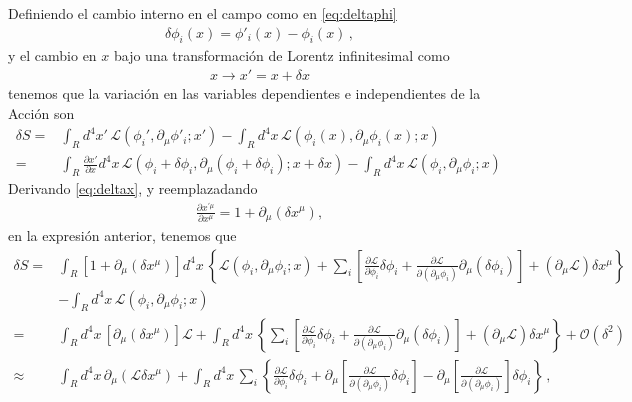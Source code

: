 \begin{frame}
Definiendo el cambio interno en el campo como en \eqref{eq:deltaphi}
\begin{align}
  \delta\phi_i(x)=\phi'_i(x)-\phi_i(x)\,,
\end{align}
y el cambio en $x$ bajo una transformación de Lorentz infinitesimal como
\begin{align}
\label{eq:deltax}
  x\to x'=x+\delta x
\end{align}
tenemos que la variación en las variables dependientes e independientes de la Acción son
\begin{align}
   \delta S=&\int_{R}d^4x'\,\mathcal{L} \left( \phi_{i}',\partial_{\mu}\phi'_i;x' \right)- \int_{R}d^4x\,\mathcal{L} \left( \phi_{i}(x),\partial_{\mu}\phi_i(x);x \right) \nonumber\\
     =&\int_{R}\frac{\partial x'}{\partial x}d^4x\,\mathcal{L} \left( \phi_{i}+\delta\phi_i,\partial_{\mu}(\phi_i+\delta\phi_i);x+\delta x \right)- \int_{R}d^4x\,\mathcal{L} \left( \phi_{i},\partial_{\mu}\phi_i;x \right)\,
\end{align}
Derivando \eqref{eq:deltax}, y reemplazadando
\begin{align}
  \frac{\partial x^{\prime \mu}}{\partial x^{\mu}}=1+\partial_{\mu} \left( \delta x^{\mu} \right),
\end{align}
en la expresión anterior, tenemos que
\begin{align}
     \delta S =&\int_{R} \left[ 1+\partial_{\mu} \left( \delta x^{\mu}  \right)\right]  d^4x\,\left\{ \mathcal{L}(\phi_i,\partial_{\mu}\phi_i;x)+\sum_i \left[ \frac{\partial\mathcal{L}}{\partial\phi_i}\delta\phi_{i} +\frac{\partial\mathcal{L}}{\partial(\partial_{\mu}\phi_i)}\partial_{\mu}(\delta\phi_{i}) \right]+\left( \partial_{\mu}\mathcal{L} \right)\delta x^{\mu} \right\}\nonumber\\
      &- \int_{R}d^4x\,\mathcal{L} \left( \phi_{i},\partial_{\mu}\phi_i;x \right) \nonumber\\
     =&\int_{R} d^4x\,\left[ \partial_{\mu} \left( \delta x^{\mu}  \right)\right] \mathcal{L} + \int_{R}d^4x\,\left\{\sum_i \left[ \frac{\partial\mathcal{L}}{\partial\phi_i}\delta\phi_{i} +\frac{\partial\mathcal{L}}{\partial(\partial_{\mu}\phi_i)}\partial_{\mu}(\delta\phi_{i}) \right]+\left( \partial_{\mu}\mathcal{L} \right)\delta x^{\mu} \right\}+\mathcal{O} \left( \delta^2 \right)\nonumber\\
     \approx&\int_{R} d^4x\,\partial_{\mu} \left(\mathcal{L} \delta x^{\mu}  \right)  + \int_{R}d^4x\,\sum_i \left\{ \frac{\partial\mathcal{L}}{\partial\phi_i}\delta\phi_{i} +\partial_{\mu} \left[ \frac{\partial\mathcal{L}}{\partial(\partial_{\mu}\phi_i)}\delta\phi_{i} \right]-\partial_{\mu} \left[ \frac{\partial\mathcal{L}}{\partial(\partial_{\mu}\phi_i)}\right]\delta\phi_{i}  \right\}\,,

\end{align}
\end{frame}
